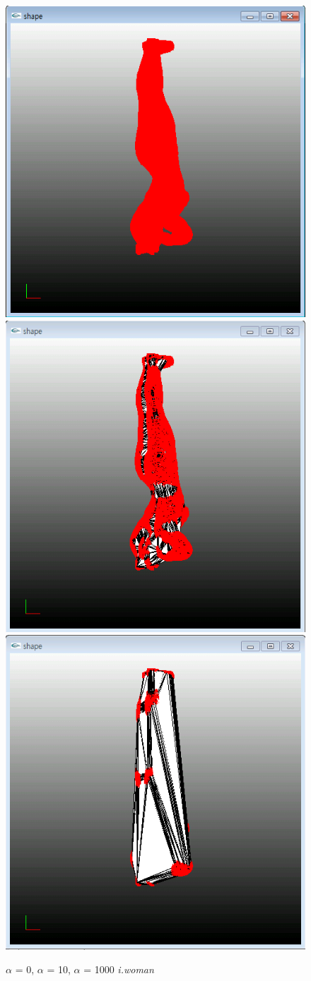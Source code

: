 \documentclass[11pt]{article}
\begin{document}
\begin{figure}[ht]
\includegraphics[width=.5\textwidth]{FIGS/alpha0-iwoman}
\hspace{1cm}
\includegraphics[width=.5\textwidth]{FIGS/alpha10-iwoman}
\vspace{1cm}
\includegraphics[width=.5\textwidth]{FIGS/alpha1000-iwoman}
\caption{$\alpha$ = 0, $\alpha$ = 10, $\alpha$ = 1000 \textit{i.woman}}
\end{figure}
\end{document}
